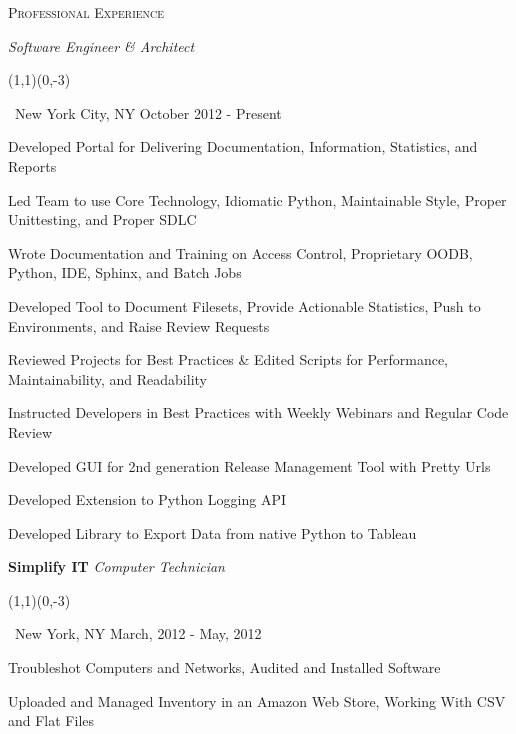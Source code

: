 \documentclass[letterpaper,10pt]{article}
\newcommand{\sbullet}{\,\begin{picture}(1,1)(0,-3)\circle*{3}\end{picture}\ }
\begin{document}
\vspace{-1mm}
\textsc{Professional Experience}
\vspace{.5mm}
  \hline
{\addtolength{\leftskip}{0mm} \textbf{\anonemployer} \emph{Software Engineer \& Architect} %
\sbullet New York City, NY \hfill{} October 2012 - Present

\vspace{-2mm} {\addtolength{\leftskip}{0mm}
\begin{itemize}\setlength{\itemsep}{0cm}\setlength{\parskip}{0cm} {\addtolength{\leftskip}{-5mm}
  \item Developed Portal for Delivering Documentation, Information, Statistics, and Reports
  \item Led Team to use Core Technology, Idiomatic Python, Maintainable Style, Proper Unittesting, and Proper SDLC
  \item Wrote Documentation and Training on Access Control, Proprietary OODB, Python, IDE, Sphinx, and Batch Jobs
  \item Developed Tool to Document Filesets, Provide Actionable Statistics, Push to Environments, and Raise Review Requests
  \item Reviewed Projects for Best Practices \& Edited Scripts for Performance, Maintainability, and Readability
  \item Instructed Developers in Best Practices with Weekly Webinars and Regular Code Review
  \item Developed GUI for 2nd generation Release Management Tool with Pretty Urls
  \item Developed Extension to Python Logging API
  \item Developed Library to Export Data from native Python to Tableau

}
\end{itemize}

}}

\vspace{-1mm} %
{\addtolength{\leftskip}{0mm} \textbf{Simplify IT} \emph{Computer Technician} 
\sbullet New York, NY \hfill{} March, 2012 - May, 2012

\vspace{-2mm} {\addtolength{\leftskip}{0mm}
\begin{itemize}\setlength{\itemsep}{0cm}\setlength{\parskip}{0cm} {\addtolength{\leftskip}{-5mm}
  \item Troubleshot Computers and Networks, Audited and Installed Software
  \item Uploaded and Managed Inventory in an Amazon Web Store, Working With CSV and Flat Files

}
\end{itemize}

}}
\end{document}
